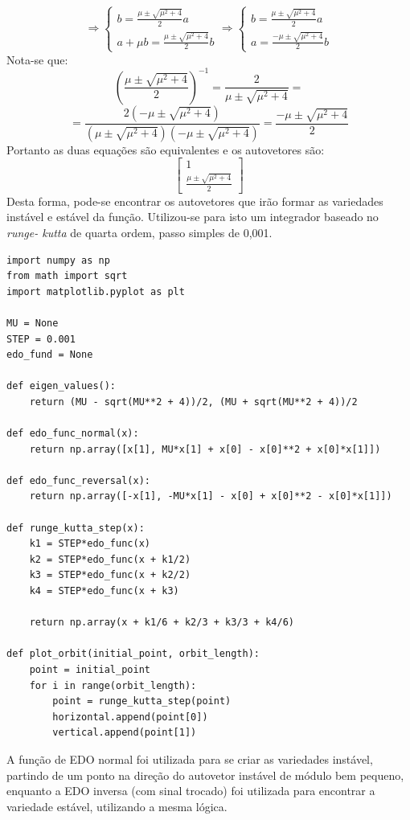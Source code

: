 \documentclass{article}[twocolumn]
\begin{document}
	\begin{equation}
		\Rightarrow \left\{\begin{array}{l}
			b = \frac{\mu \pm \sqrt{\mu^2 + 4}}{2}a\\
			a + \mu b = \frac{\mu \pm \sqrt{\mu^2 + 4}}{2}b
		\end{array}\right.
		\Rightarrow \left\{\begin{array}{l}
			b = \frac{\mu \pm \sqrt{\mu^2 + 4}}{2}a\\
			a = \frac{-\mu \pm \sqrt{\mu^2 + 4}}{2}b
		\end{array}\right.
		\nonumber
	\end{equation}
	Nota-se que:
	\begin{equation}
		\left(\frac{\mu \pm \sqrt{\mu^2 + 4}}{2}\right)^{-1} =
		\frac{2}{\mu \pm \sqrt{\mu^2 + 4}} =
		\nonumber
	\end{equation}
	\begin{equation}
		= \frac{2(-\mu \pm \sqrt{\mu^2 + 4})}{(\mu \pm \sqrt{\mu^2 + 4})(-\mu \pm \sqrt{\mu^2 + 4})}
		= \frac{-\mu \pm \sqrt{\mu^2 + 4}}{2}
		\nonumber
	\end{equation}
	Portanto as duas equa\c{c}\~oes s\~ao equivalentes e os autovetores s\~ao:
	\begin{equation}
		\left[\begin{array}{c}
			1\\
			\frac{\mu \pm \sqrt{\mu^2 + 4}}{2}
		\end{array}\right]
		\nonumber
	\end{equation}
	Desta forma, pode-se encontrar os autovetores que ir\~ao formar as variedades inst\'avel
	e est\'avel da fun\c{c}\~ao. Utilizou-se para isto um integrador baseado no \textit{runge-
	kutta} de quarta ordem, passo simples de 0,001.
	\begin{verbatim}
import numpy as np
from math import sqrt
import matplotlib.pyplot as plt

MU = None
STEP = 0.001
edo_fund = None

def eigen_values():
    return (MU - sqrt(MU**2 + 4))/2, (MU + sqrt(MU**2 + 4))/2

def edo_func_normal(x):
    return np.array([x[1], MU*x[1] + x[0] - x[0]**2 + x[0]*x[1]])

def edo_func_reversal(x):
    return np.array([-x[1], -MU*x[1] - x[0] + x[0]**2 - x[0]*x[1]])

def runge_kutta_step(x):
    k1 = STEP*edo_func(x)
    k2 = STEP*edo_func(x + k1/2)
    k3 = STEP*edo_func(x + k2/2)
    k4 = STEP*edo_func(x + k3)

    return np.array(x + k1/6 + k2/3 + k3/3 + k4/6)

def plot_orbit(initial_point, orbit_length):
    point = initial_point
    for i in range(orbit_length):
        point = runge_kutta_step(point)
        horizontal.append(point[0])
        vertical.append(point[1])
	\end{verbatim}
	A fun\c{c}\~ao de EDO normal foi utilizada para se criar as variedades inst\'avel,
	partindo de um ponto na dire\c{c}\~ao do autovetor inst\'avel de m\'odulo bem pequeno,
	enquanto a EDO inversa (com sinal trocado) foi utilizada para encontrar a variedade
	est\'avel, utilizando a mesma l\'ogica.
\end{document}
